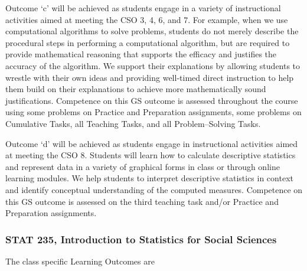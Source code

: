 \documentclass[11pt]{article}
\begin{document}
  
 
 Outcome `c' will be achieved as students engage in a variety of 
 instructional activities aimed at meeting the CSO 3, 4, 6, and 7. 
 For example, when we use computational algorithms to solve problems, 
 students do not merely describe the procedural steps in performing a 
 computational algorithm, but are required to provide mathematical 
 reasoning that supports the efficacy and justifies the accuracy of 
 the algorithm. We support their explanations by allowing students 
 to wrestle with their own ideas and providing well-timed direct 
 instruction to help them build on their explanations to achieve 
 more mathematically sound justifications. Competence on this GS 
 outcome is assessed throughout the course using some problems on 
 Practice and Preparation assignments, some problems on Cumulative 
 Tasks, all Teaching Tasks, and all Problem--Solving Tasks. 
 
   
 Outcome `d' will be achieved as students engage in instructional 
 activities aimed at meeting the CSO 8. Students will learn how to 
 calculate descriptive statistics and represent data in a variety of 
 graphical forms in class or through online learning modules. 
 We help students to interpret descriptive statistics in context 
 and identify conceptual understanding of the computed measures. 
 Competence on this GS outcome is assessed on the third teaching 
 task and/or Practice and Preparation assignments.  

 \subsubsection{STAT 235, Introduction to Statistics for Social Sciences} 
 
 The class specific Learning Outcomes are
\end{document}
